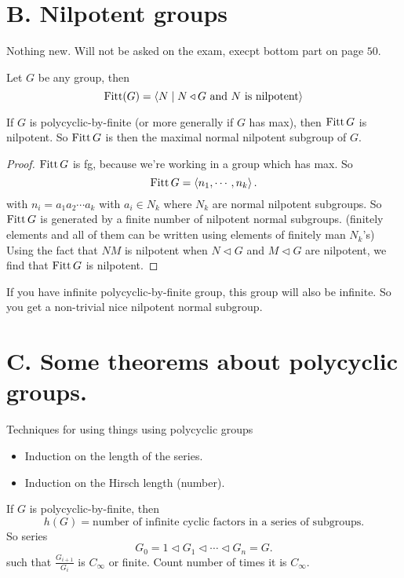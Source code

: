 \section*{B. Nilpotent groups}
Nothing new. Will not be asked on the exam, execpt bottom part on page $50$.

\begin{definition}
    Let $G$ be any group, then \[
    \operatorname{Fitt} (G) = \left<N  \mid  N \triangleleft G \text{ and $N$ is nilpotent} \right>
\]
\end{definition}

\begin{corollary}[13]
    If $G$ is polycyclic-by-finite (or more generally if $G$ has max), then $\operatorname{Fitt} G$ is nilpotent.
    So $\operatorname{Fitt} G $ is then the maximal normal nilpotent subgroup of  $G$.
\end{corollary}
\begin{proof}
    $\operatorname{Fitt} G$ is fg, because we're working in a group which has max.
    So
    \[
    \operatorname{Fitt} G = \left<n_1, \cdots, n_k \right>
    .\] 
    with $n_i = a_1 a_2 \cdots a_k$ with $a_i \in N_k$ where $N_k$ are normal nilpotent subgroups.
    So $\operatorname{Fitt} G$ is generated by a finite number of nilpotent normal subgroups. (finitely elements and all of them can be written using elements of finitely man $N_k$'s)
    Using the fact that  $N M$ is nilpotent when  $N\triangleleft G$ and $M \triangleleft G$ are nilpotent,
    we find that $\operatorname{Fitt} G$ is nilpotent.
\end{proof}

\begin{remark}
    If you have infinite polycyclic-by-finite group, this group will also be infinite.
    So you get a non-trivial nice nilpotent normal subgroup.
\end{remark}

\section*{C. Some theorems about polycyclic groups.}

Techniques for using things using polycyclic groups
\begin{itemize}
    \item Induction on the length of the series.
    \item Induction on the Hirsch length (number).
\end{itemize}
\begin{definition}
    If $G$ is polycyclic-by-finite, then
    \[
        h(G) = \text{number of infinite cyclic factors in a series of subgroups}
    .\] 
    So series
    \[
    G_0 = 1 \triangleleft  G_1 \triangleleft \cdots \triangleleft  G_n   = G
    .\] 
    such  that $\frac{G_{i+1}}{G_i}$ is $C_\infty$ or finite.
    Count number of times it is $C_{\infty}$.
\end{definition}

